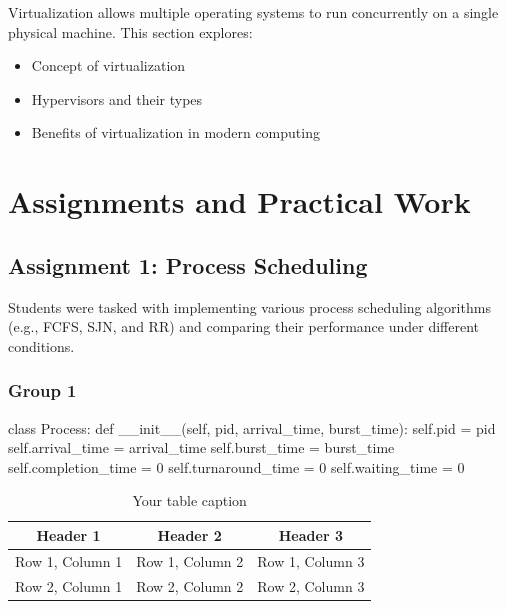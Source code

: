 \documentclass[12pt]{article}
\begin{document}
Virtualization allows multiple operating systems to run concurrently on a single physical machine. This section explores:
\begin{itemize}
    \item Concept of virtualization
    \item Hypervisors and their types
    \item Benefits of virtualization in modern computing
\end{itemize}

\section{Assignments and Practical Work}
\subsection{Assignment 1: Process Scheduling}
Students were tasked with implementing various process scheduling algorithms (e.g., FCFS, SJN, and RR) and comparing their performance under different conditions.
\subsubsection{Group 1}
\begin{python}
    class Process:
    def __init__(self, pid, arrival_time, burst_time):
        self.pid = pid
        self.arrival_time = arrival_time
        self.burst_time = burst_time
        self.completion_time = 0
        self.turnaround_time = 0
        self.waiting_time = 0
\end{python}

\begin{table}[htbp] %
    \centering
    \begin{tabular}{|c|c|c|} %
    \hline
    Header 1 & Header 2 & Header 3 \\ %
    \hline
    Row 1, Column 1 & Row 1, Column 2 & Row 1, Column 3 \\ %
    \hline
    Row 2, Column 1 & Row 2, Column 2 & Row 2, Column 3 \\ %
    \hline
    \end{tabular}
    \caption{Your table caption} %
    \label{tab:your_label} %
\end{table}
\end{document}
